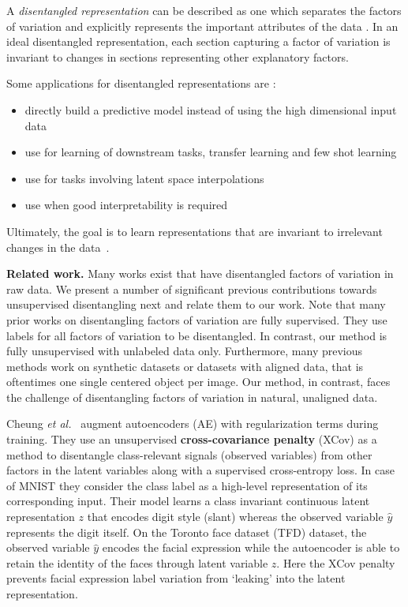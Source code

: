 \documentclass[a4paper,12pt]{report}
\begin{document}
A \textit{disentangled representation} can be described as one which separates the factors of variation and explicitly represents the important attributes of the data \cite{Framework4QuantEvalDisRepr}. In an ideal disentangled representation, each section capturing a factor of variation is invariant to changes in sections representing other explanatory factors.

Some applications for disentangled representations are \cite{ChallengeAssLofDisRepr}:
\begin{itemize}
  \item directly build a predictive model instead of using the high dimensional input data
  \item use for learning of downstream tasks, transfer learning and few shot learning
  \item use for tasks involving latent space interpolations
  \item use when good interpretability is required
\end{itemize}
Ultimately, the goal is to learn representations that are invariant to irrelevant changes in the data~\cite{FwkQuantEvalDisRep}.

\par \textbf{Related work.} Many works exist that have disentangled factors of variation in raw data. We present a number of significant previous contributions towards unsupervised disentangling next and relate them to our work. Note that many prior works on disentangling factors of variation are fully supervised. They use labels for all factors of variation to be disentangled. In contrast, our method is fully unsupervised with unlabeled data only. Furthermore, many previous methods work on synthetic datasets or datasets with aligned data, that is oftentimes one single centered object per image. Our method, in contrast, faces the challenge of disentangling factors of variation in natural, unaligned data.


\par Cheung \textit{et al.}~\cite{DiscHiddenFoViDN} augment autoencoders (AE) with regularization terms during training. They use an unsupervised \textbf{cross-covariance penalty} (XCov) as a method to disentangle class-relevant signals (observed variables) from other factors in the latent variables along with a supervised cross-entropy loss. In case of MNIST they consider the class label as a high-level representation of its corresponding input. Their model learns a class invariant continuous latent representation $z$ that encodes digit style (slant) whereas the observed variable $\hat{y}$ represents the digit itself. On the Toronto face dataset (TFD) dataset, the observed variable $\hat{y}$ encodes the facial expression while the autoencoder is able to retain the identity of the faces through latent variable $z$. Here the XCov penalty prevents facial expression label variation from ‘leaking’ into the latent representation.
\end{document}
